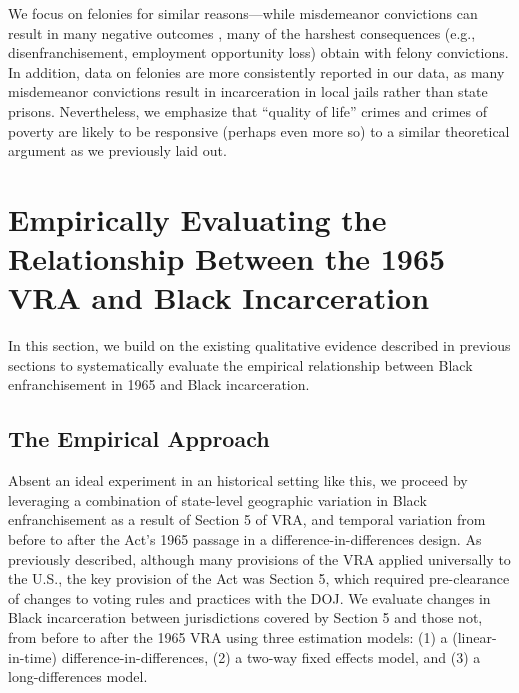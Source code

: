 \documentclass[12pt]{article}
\begin{document}
We focus on felonies for similar reasons---while misdemeanor convictions can result in many negative outcomes \citep{White:2019ks},  many of the harshest consequences (e.g., disenfranchisement, employment opportunity loss) obtain with felony convictions.  In addition, data on felonies are more consistently reported in our data, as many misdemeanor convictions result in incarceration in local jails rather than state prisons.  Nevertheless, we emphasize that ``quality of life'' crimes and crimes of poverty are likely to be responsive (perhaps even more so) to a similar theoretical argument as we previously laid out.











\section*{Empirically Evaluating the Relationship Between the 1965 VRA and Black Incarceration}

In this section, we build on the existing qualitative evidence described in previous sections to systematically evaluate the empirical relationship between Black enfranchisement in 1965 and Black incarceration.


\subsection*{The Empirical Approach}

Absent an ideal experiment in an historical setting like this, we proceed by leveraging a combination of state-level geographic variation in Black enfranchisement as a result of Section 5 of VRA, and temporal variation from before to after the Act's 1965 passage in a difference-in-differences design.  As previously described, although many provisions of the VRA applied universally to the U.S., the key provision of the Act was Section 5, which required pre-clearance of changes to voting rules and practices with the DOJ.  We evaluate changes in Black incarceration between jurisdictions covered by Section 5 and those not, from before to after the 1965 VRA using three estimation models: (1) a (linear-in-time) difference-in-differences, (2) a two-way fixed effects model, and (3) a long-differences model.
\end{document}
